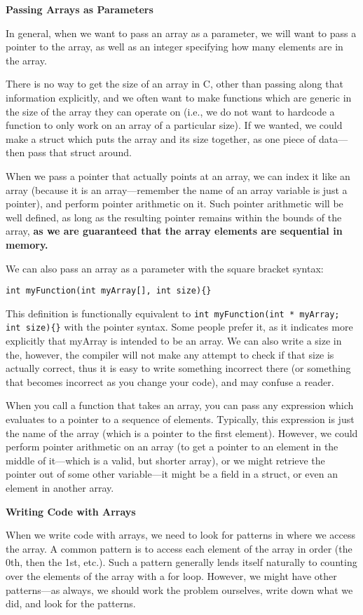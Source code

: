 \documentclass[11pt, a4paper]{article}
\begin{document}
\textbf{Passing Arrays as Parameters}

In general, when we want to pass an array as a parameter, we will want to pass a pointer to the array, as well as an integer specifying how many elements are in the array.

There is no way to get the size of an array in C, other than passing along that information explicitly, and we often want to make functions which are generic in the size of the array they can operate on (i.e., we do not want to hardcode a function to only work on an array of a particular size). If we wanted, we could make a struct which puts the array and its size together, as one piece of data—then pass that struct around.

When we pass a pointer that actually points at an array, we can index it like an array (because it is an array—remember the name of an array variable is just a pointer), and perform pointer arithmetic on it. Such pointer arithmetic will be well defined, as long as the resulting pointer remains within the bounds of the array, \textbf{as we are guaranteed that the array elements are sequential in memory.}

We can also pass an array as a parameter with the square bracket syntax:

\texttt{int myFunction(int myArray[], int size)\{\}} 

This definition is functionally equivalent to \texttt{int myFunction(int * myArray; int size)\{\}}  with the pointer syntax. Some people prefer it, as it indicates more explicitly that myArray is intended to be an array. We can also write a size in the{}, however, the compiler will not make any attempt to check if that size is actually correct, thus it is easy to write something incorrect there (or something that becomes incorrect as you change your code), and may confuse a reader.


When you call a function that takes an array, you can pass any expression which evaluates to a pointer to a sequence of elements. Typically, this expression is just the name of the array (which is a pointer to the first element). However, we could perform pointer arithmetic on an array (to get a pointer to an element in the middle of it—which is a valid, but shorter array), or we might retrieve the pointer out of some other variable—it might be a field in a struct, or even an element in another array.


\textbf{Writing Code with Arrays}

When we write code with arrays, we need to look for patterns in where we access the array. A common pattern is to access each element of the array in order (the 0th, then the 1st, etc.). Such a pattern generally lends itself naturally to counting over the elements of the array with a for loop. However, we might have other patterns—as always, we should work the problem ourselves, write down what we did, and look for the patterns.
\end{document}
